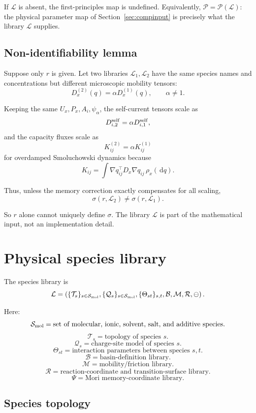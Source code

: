 \documentclass[11pt]{article}
\newcommand{\dd}{\,\mathrm d}
\begin{document}
If \(\mathcal L\) is absent, the first-principles map is undefined. Equivalently,
\(\mathcal P=\mathcal P(\mathcal L)\): the physical parameter map of
Section~\ref{sec:compinput} is precisely what the library \(\mathcal L\)
supplies.

\subsection{Non-identifiability lemma}

Suppose only \(r\) is given. Let two libraries \(\mathcal L_1,\mathcal L_2\)
have the same species names and concentrations but different microscopic
mobility tensors:
\[
D_x^{(2)}(q)=\alpha D_x^{(1)}(q),
\qquad
\alpha\neq1.
\]

Keeping the same \(U_x,P_x,A_i,\psi_\alpha\), the self-current tensors scale as
\[
D_{i,2}^{\rm self}
=
\alpha D_{i,1}^{\rm self},
\]
and the capacity fluxes scale as
\[
K_{ij}^{(2)}
=
\alpha K_{ij}^{(1)}
\]
for overdamped Smoluchowski dynamics because
\[
K_{ij}
=
\int
\nabla q_{ij}^{\top}D_x\nabla q_{ij}\,\rho_x(\dd q).
\]

Thus, unless the memory correction exactly compensates for all scaling,
\[
\sigma(r,\mathcal L_2)\neq\sigma(r,\mathcal L_1).
\]

So \(r\) alone cannot uniquely define \(\sigma\). The library \(\mathcal L\) is
part of the mathematical input, not an implementation detail.

\section{Physical species library}
\label{sec:library}

The species library is
\[
\mathcal L=
\left(
\{\mathcal T_s\}_{s\in\mathcal S_{\rm mol}},
\{\mathcal Q_s\}_{s\in\mathcal S_{\rm mol}},
\{\Theta_{st}\}_{s,t},
\mathcal B,
\mathcal M,
\mathcal R,
\mathcal \Psi
\right).
\]

Here:
\[
\mathcal S_{\rm mol}
=
\text{set of molecular, ionic, solvent, salt, and additive species}.
\]
\[
\mathcal T_s
=
\text{topology of species }s.
\]
\[
\mathcal Q_s
=
\text{charge-site model of species }s.
\]
\[
\Theta_{st}
=
\text{interaction parameters between species }s,t.
\]
\[
\mathcal B
=
\text{basin-definition library}.
\]
\[
\mathcal M
=
\text{mobility/friction library}.
\]
\[
\mathcal R
=
\text{reaction-coordinate and transition-surface library}.
\]
\[
\mathcal \Psi
=
\text{Mori memory-coordinate library}.
\]

\subsection{Species topology}
\end{document}
